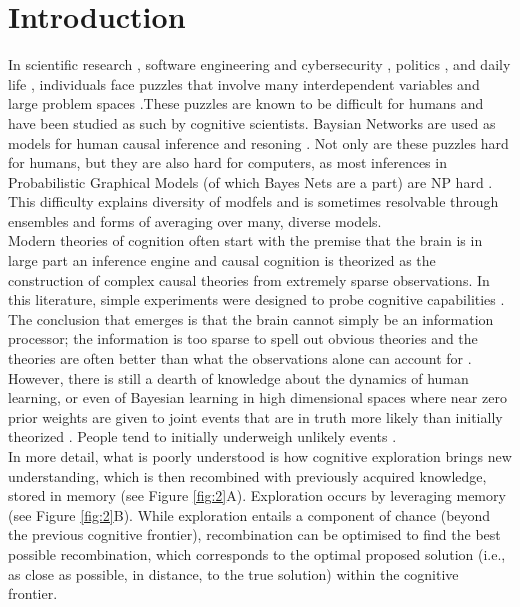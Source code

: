 \section{Introduction}
In scientific research \cite{hisano2013challenges}, software engineering and cybersecurity \cite{littlewood1989predicting,maillart2017given}, politics \cite{clinton2014hard}, and daily life \cite{gerson1986hard}, individuals face puzzles that involve many interdependent variables and large problem spaces \cite{koller09, Pearl2009CMR}.These puzzles are known to be difficult for humans and have been studied as such by cognitive scientists. Baysian Networks are used as models for human causal inference and resoning \cite{bramley2015staying, castnerForthcoming, Griffiths2008, Pearl88, Spiegler2016, spiegler2015}. Not only are these puzzles hard for humans, but they are also hard for computers, as most inferences in Probabilistic Graphical Models (of which Bayes Nets are a part) are NP hard \cite{koller09}. This difficulty explains diversity of modfels and is sometimes resolvable through ensembles and forms of averaging over many, diverse models.\\ 

Modern theories of cognition often start with the premise that the brain is in large part an inference engine \cite{Tenenbaum06theory-basedbayesian} and causal cognition is theorized as the construction of complex causal theories from extremely sparse observations. In this literature, simple experiments were designed to probe cognitive capabilities \cite{tenenbaum2001structure}. The conclusion that emerges is that the brain cannot simply be an information processor; the information is too sparse to spell out obvious theories and the theories are often better than what the observations alone can account for \cite{ortoleva2012modeling, Hong04}.  \\

However, there is still a dearth of knowledge about the dynamics of human learning, or even of Bayesian learning in high dimensional spaces where near zero prior weights are given to joint events that are in truth more likely than initially theorized \cite{ortoleva2012modeling}. People tend to initially underweigh unlikely events \cite{taleb2007}.\\

In more detail, what is poorly understood is how cognitive exploration brings new understanding, which is then recombined with previously acquired knowledge, stored in memory (see Figure \ref{fig:2}A). Exploration occurs by leveraging memory (see Figure \ref{fig:2}B). While exploration entails a component of chance (beyond the previous cognitive frontier), recombination can be optimised to find the best possible recombination, which corresponds to the optimal proposed solution (i.e., as close as possible, in distance, to the true solution) within the cognitive frontier.\\

